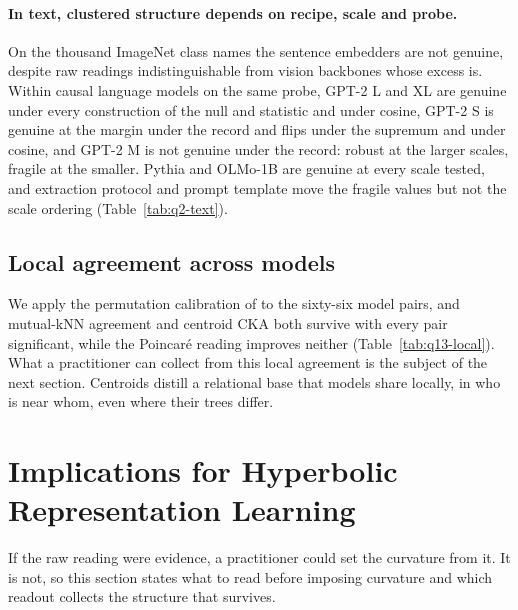 \documentclass{article}
\theoremstyle{definition}
\begin{document}
\paragraph{In text, clustered structure depends on recipe, scale and probe.} On the thousand ImageNet class names the sentence embedders are not genuine, despite raw readings indistinguishable from vision backbones whose excess is. Within causal language models on the same probe, GPT-2 L and XL are genuine under every construction of the null and statistic and under cosine, GPT-2 S is genuine at the margin under the record and flips under the supremum and under cosine, and GPT-2 M is not genuine under the record: robust at the larger scales, fragile at the smaller. Pythia and OLMo-1B are genuine at every scale tested, and extraction protocol and prompt template move the fragile values but not the scale ordering (Table~\ref{tab:q2-text}). %

\subsection{Local agreement across models}
\label{sec:v2-local}

We apply the permutation calibration of \citet{groger2026aristotelian} to the sixty-six model pairs, and mutual-kNN agreement and centroid CKA both survive with every pair significant, while the Poincar\'{e} reading improves neither (Table~\ref{tab:q13-local}). What a practitioner can collect from this local agreement is the subject of the next section. Centroids distill a relational base that models share locally, in who is near whom, even where their trees differ. %

\section{Implications for Hyperbolic Representation Learning}
\label{sec:practice}

If the raw reading were evidence, a practitioner could set the curvature from it. It is not, so this section states what to read before imposing curvature and which readout collects the structure that survives.
\end{document}
